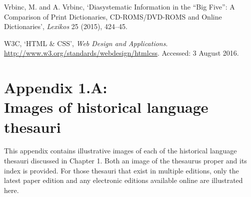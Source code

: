 \begin{list}{}


\item %
Vrbinc, M. and A. Vrbinc, `Diasystematic Information in the ``Big Five'': A Comparison of Print Dictionaries, CD-ROMS/DVD-ROMS and Online Dictionaries', \textit{Lexikos} 25 (2015), 424–45.

\item %
W3C, `HTML \& CSS', \textit{Web Design and Applications}. \url{http://www.w3.org/standards/webdesign/htmlcss}. Accessed: 3 August 2016.




\end{list}




\newpage
\section*{Appendix 1.A:\\Images of historical language thesauri}
\label{Appendix1.A}
\begingroup
\renewcommand{\thefigure}{1.A.\arabic{figure}}
\setcounter{figure}{0}
\renewcommand{\thetable}{1.A.\arabic{table}}
\setcounter{table}{0}

This appendix contains illustrative images of each of the historical language thesauri discussed in Chapter 1. Both an image of the thesaurus proper and its index is provided. For those thesauri that exist in multiple editions, only the latest paper edition and any electronic editions available online are illustrated here.


